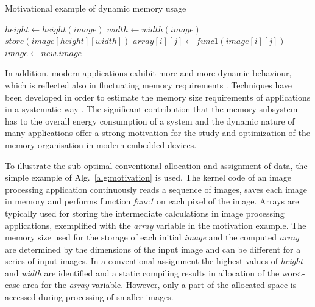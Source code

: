 \begin{algorithm}
\caption{Motivational example of dynamic memory usage}
 \label{alg:motivation}
 \begin{algorithmic}[1]
		\STATE $height \gets height(image)$
		\STATE $width \gets width(image)$
		\STATE $store(image[height][width])$
					\STATE $array[i][j] \gets func1(image[i][j])$
				\ENDFOR
			\ENDFOR
		\STATE $image \gets new.image$	
	\ENDWHILE
 \end{algorithmic}
\end{algorithm}

In addition, modern applications exhibit more and more dynamic behaviour, which is reflected also in fluctuating memory requirements \cite{tcm}. 
Techniques have been developed in order to estimate the memory size requirements of applications in a systematic way \cite{Ang13}. 
The significant contribution that the memory subsystem has to the overall energy consumption of a system and the dynamic nature of many applications offer a strong motivation for the study and optimization of the memory organisation in modern embedded devices.

To illustrate the sub-optimal conventional allocation and assignment of data, the simple example of Alg.~\ref{alg:motivation} is used. 
The kernel code of an image processing application continuously reads a sequence of images, saves each image in memory and performs function \textit{func1} on each pixel of the image. 
Arrays are typically used for storing the intermediate calculations in image processing applications, exemplified with the \textit{array} variable in the motivation example. 
The memory size used for the storage of each initial \textit{image} and the computed \textit{array} are determined by the dimensions of the input image and can be different for a series of input images. 
In a conventional assignment the highest values of \textit{height} and \textit{width} are identified and a static compiling results in allocation of the worst-case area for the \textit{array} variable. 
However, only a part of the allocated space is accessed during processing of smaller images. 

